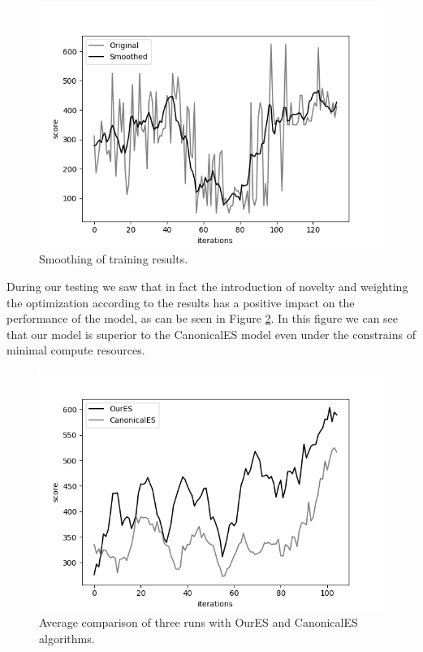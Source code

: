 \documentclass[11 pt, twocolumn]{article}
\begin{document}
\begin{figure}[h!]
  \includegraphics[width=\linewidth]{QbertNoiseComparison.png}
  \caption{Smoothing of training results.}
  \label{fig:noise_comp}
\end{figure}

During our testing we saw that in fact the introduction of novelty and weighting the optimization according to the results has a positive impact on the performance of the model, as can be seen in Figure \ref{fig:comp_res}. In this figure we can see that our model is superior to the CanonicalES model even under the constrains of minimal compute resources. 

\begin{figure}[h!]
  \includegraphics[width=\linewidth]{averageComparison.png}
  \caption{Average comparison of three runs with OurES and CanonicalES algorithms.}
  \label{fig:comp_res}
\end{figure}
\end{document}
